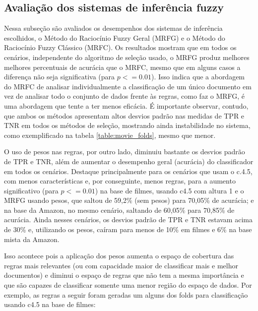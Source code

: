 \documentclass[template.tex]{subfiles}
\begin{document}
\subsection{Avaliação dos sistemas de inferência fuzzy}

Nessa subseção são avaliados os desempenhos dos sistemas de inferência escolhidos, o Método do Raciocínio Fuzzy Geral (MRFG) e o Método do Raciocínio Fuzzy Clássico (MRFC). Os resultados mostram que em todos os cenários, independente do algoritmo de seleção usado, o MRFG produz melhores melhores percentuais de acurácia que o MRFC, mesmo que em alguns casos a diferença não seja significativa (para $p <= 0.01$). Isso indica que a abordagem do MRFC de analisar individualmente a classificação de um único documento em vez de analisar todo o conjunto de dados frente às regras, como faz o MRFG, é uma abordagem que tente a ter menos eficácia. É importante observar, contudo, que ambos os métodos apresentam altos desvios padrão nas medidas de TPR e TNR em todos os métodos de seleção, mostrando ainda instabilidade no sistema, como exemplificado na tabela \ref{table:movie_folds}, mesmo que menor. 

O uso de pesos nas regras, por outro lado, diminuiu bastante os desvios padrão de TPR e TNR, além de aumentar o desempenho geral (acurácia) do classificador em todos os cenários. Destaque principalmente para os cenários que usam o c.4.5, com menos características e, por conseguinte, menos regras, para a aumento significativo (para $p <= 0.01$) na base de filmes, usando c4.5 com altura 1 e o MRFG usando pesos, que saltou de 59,2\% (sem pesos) para 70,05\% de acurácia; e na base da Amazon, no mesmo cenário, saltando de 60,05\% para 70,85\% de acurácia. Ainda nesses cenários, os desvios padrão de TPR e TNR estavam acima de 30\% e, utilizando os pesos, caíram para menos de 10\% em filmes e 6\% na base mista da Amazon.

Isso acontece pois a aplicação dos pesos aumenta o espaço de cobertura das regras mais relevantes (ou com capacidade maior de classificar mais e melhor documentos) e diminui o espaço de regras que não tem a mesma importância e que são capazes de classificar somente uma menor região do espaço de dados. Por exemplo, as regras a seguir foram geradas um alguns dos folds para classificação usando c4.5 na base de filmes:
\end{document}
